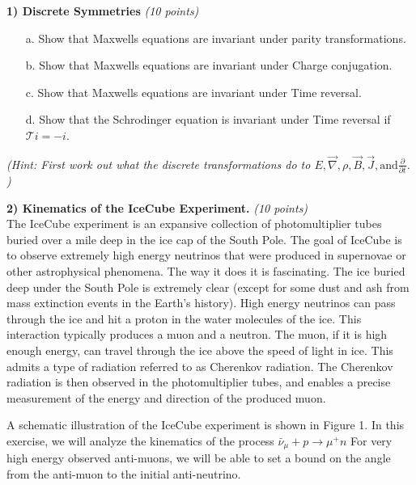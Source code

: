 {\large

\textbf{1) Discrete Symmetries } \hfill \textit{(10 points)}\\

\begin{itemize}
\item[a.]{ Show that Maxwells equations are invariant under parity transformations.}
\item[b.]{ Show that Maxwells equations are invariant under Charge conjugation.}
\item[c.]{ Show that Maxwells equations are invariant under Time reversal.}
\item[d.]{ Show that the Schrodinger equation is invariant under Time reversal if $\mathcal{T}i = -i$.}
\end{itemize}
\textit{(Hint: First work out what the discrete transformations do to $E, \vec{\nabla}, \rho, \vec{B}, \vec{J}, \mathrm{and} \frac{\partial}{\partial t}$.  )}
\vspace*{0.25in}


\textbf{2) Kinematics of the IceCube Experiment. } \hfill \textit{(10 points)}\\

The IceCube experiment is an expansive collection of photomultiplier tubes buried over a mile deep in the ice cap of the South Pole. 
The goal of IceCube is to observe extremely high energy neutrinos that were produced in supernovae or other astrophysical phenomena. 
The way it does it is fascinating. 
The ice buried deep under the South Pole is extremely clear (except for some dust and ash from mass extinction events in the Earth’s history). 
High energy neutrinos can pass through the ice and hit a proton in the water molecules of the ice. 
This interaction typically produces a muon and a neutron. 
The muon, if it is high enough energy, can travel through the ice above the speed of light in ice.
This admits a type of radiation referred to as Cherenkov radiation. 
The Cherenkov radiation is then observed in the photomultiplier tubes, and enables a precise measurement of the energy and direction of the produced muon.

A schematic illustration of the IceCube experiment is shown in Figure 1. 
In this exercise, we will analyze the kinematics of the process $\bar{\nu}_\mu + p \rightarrow \mu^+ n $
For very high energy observed anti-muons, we will be able to set a bound on the angle from the anti-muon to the initial anti-neutrino.

}
